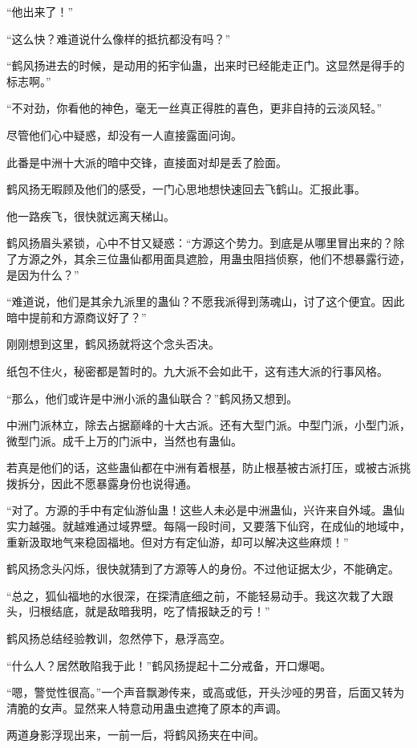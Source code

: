 \begin{this_body}
“他出来了！”

“这么快？难道说什么像样的抵抗都没有吗？”

“鹤风扬进去的时候，是动用的拓宇仙蛊，出来时已经能走正门。这显然是得手的标志啊。”

“不对劲，你看他的神色，毫无一丝真正得胜的喜色，更非自持的云淡风轻。”

尽管他们心中疑惑，却没有一人直接露面问询。

此番是中洲十大派的暗中交锋，直接面对却是丢了脸面。

鹤风扬无暇顾及他们的感受，一门心思地想快速回去飞鹤山。汇报此事。

他一路疾飞，很快就远离天梯山。

鹤风扬眉头紧锁，心中不甘又疑惑：“方源这个势力。到底是从哪里冒出来的？除了方源之外，其余三位蛊仙都用面具遮脸，用蛊虫阻挡侦察，他们不想暴露行迹，是因为什么？”

“难道说，他们是其余九派里的蛊仙？不愿我派得到荡魂山，讨了这个便宜。因此暗中提前和方源商议好了？”

刚刚想到这里，鹤风扬就将这个念头否决。

纸包不住火，秘密都是暂时的。九大派不会如此干，这有违大派的行事风格。

“那么，他们或许是中洲小派的蛊仙联合？”鹤风扬又想到。

中洲门派林立，除去占据巅峰的十大古派。还有大型门派。中型门派，小型门派，微型门派。成千上万的门派中，当然也有蛊仙。

若真是他们的话，这些蛊仙都在中洲有着根基，防止根基被古派打压，或被古派挑拨拆分，因此不愿暴露身份也说得通。

“对了。方源的手中有定仙游仙蛊！这些人未必是中洲蛊仙，兴许来自外域。蛊仙实力越强。就越难通过域界壁。每隔一段时间，又要落下仙窍，在成仙的地域中，重新汲取地气来稳固福地。但对方有定仙游，却可以解决这些麻烦！”

鹤风扬念头闪烁，很快就猜到了方源等人的身份。不过他证据太少，不能确定。

“总之，狐仙福地的水很深，在探清底细之前，不能轻易动手。我这次栽了大跟头，归根结底，就是敌暗我明，吃了情报缺乏的亏！”

鹤风扬总结经验教训，忽然停下，悬浮高空。

“什么人？居然敢陷我于此！”鹤风扬提起十二分戒备，开口爆喝。

“嗯，警觉性很高。”一个声音飘渺传来，或高或低，开头沙哑的男音，后面又转为清脆的女声。显然来人特意动用蛊虫遮掩了原本的声调。

两道身影浮现出来，一前一后，将鹤风扬夹在中间。


\end{this_body}
